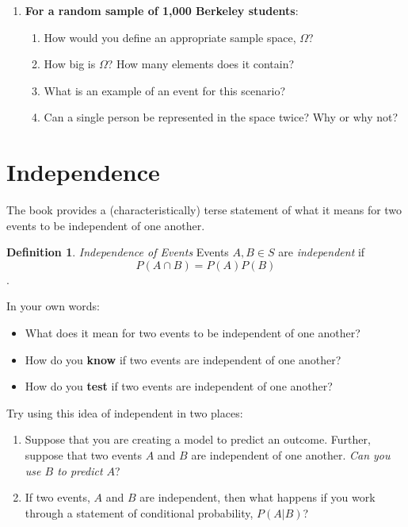 \documentclass[
]{book}
\providecommand{\tightlist}{%
  \setlength{\itemsep}{0pt}\setlength{\parskip}{0pt}}
\theoremstyle{definition}
\newtheorem{definition}{Definition}[chapter]
\theoremstyle{definition}
\theoremstyle{definition}
\theoremstyle{definition}
\theoremstyle{remark}
\begin{document}
\begin{enumerate}
\def\labelenumi{\arabic{enumi}.}
\setcounter{enumi}{1}
\tightlist
\item
  \textbf{For a random sample of 1,000 Berkeley students}:

  \begin{enumerate}
  \def\labelenumii{\arabic{enumii}.}
  \tightlist
  \item
    How would you define an appropriate sample space, \(\Omega\)?
  \item
    How big is \(\Omega\)? How many elements does it contain?
  \item
    What is an example of an event for this scenario?
  \item
    Can a single person be represented in the space twice? Why or why not?
  \end{enumerate}
\end{enumerate}

\vspace{5cm}

\hypertarget{independence}{%
\section{Independence}\label{independence}}

The book provides a (characteristically) terse statement of what it means for two events to be independent of one another.

\begin{definition}
\emph{Independence of Events} Events \(A, B \in S\) are \emph{independent} if \[P(A \cap B) = P(A)P(B)\].
\end{definition}

In your own words:

\begin{itemize}
\tightlist
\item
  What does it mean for two events to be independent of one another?
\item
  How do you \textbf{know} if two events are independent of one another?
\item
  How do you \textbf{test} if two events are independent of one another?
\end{itemize}

Try using this idea of independent in two places:

\begin{enumerate}
\def\labelenumi{\arabic{enumi}.}
\tightlist
\item
  Suppose that you are creating a model to predict an outcome. Further, suppose that two events \(A\) and \(B\) are independent of one another. \emph{Can you use \(B\) to predict \(A\)}?
\item
  If two events, \(A\) and \(B\) are independent, then what happens if you work through a statement of conditional probability, \(P(A|B)\)?
\end{enumerate}
\end{document}
